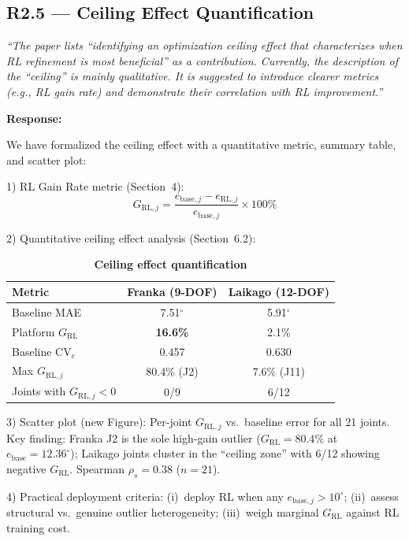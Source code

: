 \documentclass[11pt,a4paper]{article}
\newcommand{\reviewercomment}[1]{\medskip\noindent\textit{``#1''}\medskip}
\newcommand{\response}{\noindent\textbf{Response:}\par\noindent}
\begin{document}
\subsection*{R2.5 --- Ceiling Effect Quantification}

\reviewercomment{The paper lists ``identifying an optimization ceiling effect that characterizes when RL refinement is most beneficial'' as a contribution. Currently, the description of the ``ceiling'' is mainly qualitative. It is suggested to introduce clearer metrics (e.g., RL gain rate) and demonstrate their correlation with RL improvement.}

\response
We have formalized the ceiling effect with a quantitative metric, summary table, and scatter plot:

1) RL Gain Rate metric (Section~4):
\[
G_{\mathrm{RL},j} = \frac{e_{\mathrm{base},j} - e_{\mathrm{RL},j}}{e_{\mathrm{base},j}} \times 100\%
\]

2) Quantitative ceiling effect analysis (Section~6.2):

\begin{table}[h]
\centering\small
\caption*{\textbf{Ceiling effect quantification}}
\begin{tabular}{lcc}
\toprule
Metric & Franka (9-DOF) & Laikago (12-DOF) \\
\midrule
Baseline MAE & 7.51$^\circ$ & 5.91$^\circ$ \\
Platform $G_{\mathrm{RL}}$ & \textbf{16.6\%} & 2.1\% \\
Baseline $\mathrm{CV}_e$ & 0.457 & 0.630 \\
Max $G_{\mathrm{RL},j}$ & 80.4\% (J2) & 7.6\% (J11) \\
Joints with $G_{\mathrm{RL},j} < 0$ & 0/9 & 6/12 \\
\bottomrule
\end{tabular}
\end{table}

3) Scatter plot (new Figure): Per-joint $G_{\mathrm{RL},j}$ vs.\ baseline error for all 21 joints. Key finding: Franka J2 is the sole high-gain outlier ($G_{\mathrm{RL}}=80.4\%$ at $e_{\mathrm{base}}=12.36^\circ$); Laikago joints cluster in the ``ceiling zone'' with 6/12 showing negative $G_{\mathrm{RL}}$. Spearman $\rho_s = 0.38$ ($n=21$).

4) Practical deployment criteria: (i)~deploy RL when any $e_{\mathrm{base},j} > 10^\circ$; (ii)~assess structural vs.\ genuine outlier heterogeneity; (iii)~weigh marginal $G_{\mathrm{RL}}$ against RL training cost.
\end{document}
